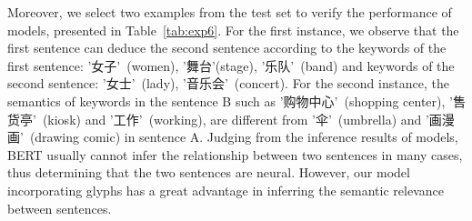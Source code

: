 \begin{CJK}{UTF8}{gbsn}
Moreover, we select two examples from the test set to verify the performance of models, presented in Table~\ref{tab:exp6}. For the first instance, we observe that the first sentence can deduce the second sentence according to the keywords of the first sentence: '女子'~(women), '舞台'(stage), '乐队'~(band) and keywords of the second sentence: '女士'~(lady), '音乐会'~(concert). For the second instance, the semantics of keywords in the sentence B such as '购物中心'~(shopping center), '售货亭'~(kiosk) and '工作'~(working), are different from '伞'~(umbrella) and '画漫画'~(drawing comic) in sentence A. Judging from the inference results of models, BERT usually cannot infer the relationship between two sentences in many cases, thus determining that the two sentences are neural. However, our model incorporating glyphs has a great advantage in inferring the semantic relevance between sentences. 
\end{CJK}


    

